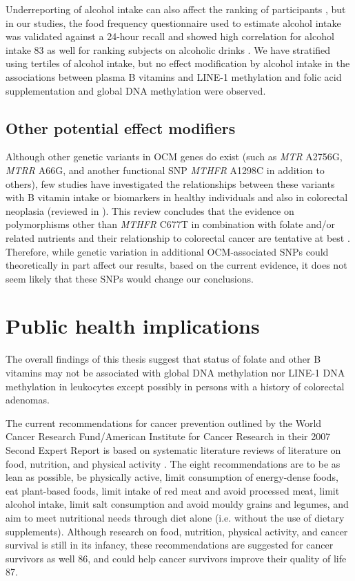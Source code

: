 \noindent Underreporting of alcohol intake can also affect the ranking of participants \cite{c782}, but in our studies, the food frequency questionnaire used to estimate alcohol intake was validated against a 24-hour recall and showed high correlation for alcohol intake 83 as well for ranking subjects on alcoholic drinks \cite{c784}. We have stratified using tertiles of alcohol intake, but no effect modification by alcohol intake in the associations between plasma B vitamins and LINE-1 methylation and folic acid supplementation and global DNA methylation were observed. 
 
\subsection{Other potential effect modifiers} %
Although other genetic variants in OCM genes do exist (such as \emph{MTR} A2756G, \emph{MTRR} A66G, and another functional SNP \emph{MTHFR} A1298C in addition to others), few studies have investigated the relationships between these variants with B vitamin intake or biomarkers in healthy individuals and also in colorectal neoplasia (reviewed in \cite{c785}). This review concludes that the evidence on polymorphisms other than \emph{MTHFR} C677T in combination with folate and/or related nutrients and their relationship to colorectal cancer are tentative at best \cite{c785}. Therefore, while genetic variation in additional OCM-associated SNPs could theoretically in part affect our results, based on the current evidence, it does not seem likely that these SNPs would change our conclusions. 
 
\section{Public health implications} %
The overall findings of this thesis suggest that status of folate and other B vitamins may not be associated with global  DNA methylation nor LINE-1 DNA methylation in leukocytes except possibly in persons with a history of colorectal adenomas. 
 
\noindent The current recommendations for cancer prevention outlined by the World Cancer Research Fund/American Institute for Cancer Research in their 2007 Second Expert Report is based on systematic literature reviews of literature on food, nutrition, and physical activity \cite{c786}. The eight recommendations are to be as lean as possible, be physically active, limit consumption of energy-dense foods, eat plant-based foods, limit intake of red meat and avoid processed meat, limit alcohol intake, limit salt consumption and avoid mouldy grains and legumes, and aim to meet nutritional needs through diet alone (i.e. without the use of dietary supplements). Although research on food, nutrition, physical activity, and cancer survival is still in its infancy, these recommendations are suggested for cancer survivors as well 86, and could help cancer survivors improve their quality of life 87. 
 
